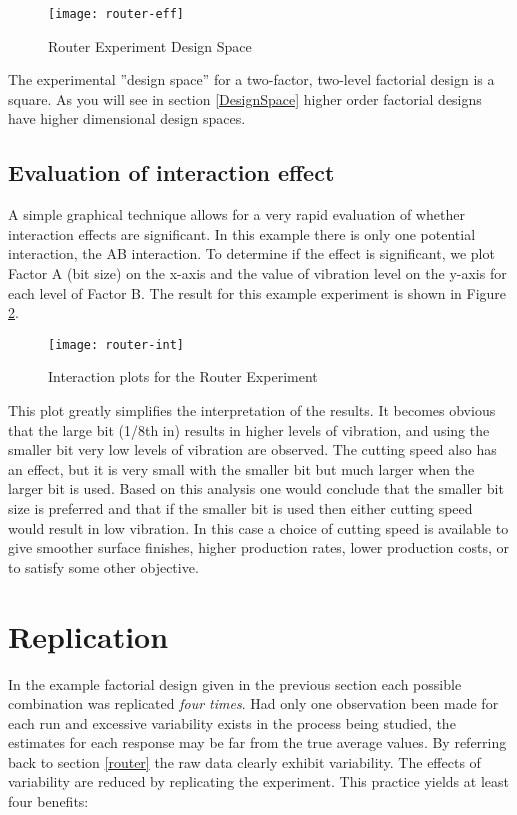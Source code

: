 \begin{figure}[h]\caption{Router Experiment Design Space}\label{fig3}
\begin{center}
\texttt{[image: router-eff]}
\end{center}
\end{figure}

\label{2facspace}
The experimental ''design space'' for a two-factor, two-level factorial design is a square.  As you will see in  section \ref{DesignSpace} higher order factorial designs have higher dimensional design spaces.

\subsection{Evaluation of interaction effect}
A simple graphical technique allows for a very rapid evaluation of whether interaction effects are significant.  In this example there is only one potential interaction, the AB interaction.  To determine if the effect is significant, we plot Factor A (bit size) on the x-axis and the value of vibration level on the y-axis for each level of Factor B.  The result for this example experiment is shown in Figure \ref{fig4}.
\begin{figure}[h]\caption{Interaction plots for the Router Experiment}\label{fig4}
\begin{center}
\texttt{[image: router-int]}
\end{center}
\end{figure}

This plot greatly simplifies the interpretation of the results.  It becomes obvious that the large bit (1/8th in) results in higher levels of vibration, and using the smaller bit very low levels of vibration are observed.  The cutting speed also has an effect, but it is very small with the smaller bit but much larger when the larger bit is used.  Based on this analysis one would conclude that the smaller bit size is preferred and that if the smaller bit is used then either cutting speed would result in low vibration.  In this case a choice of cutting speed is available to give smoother surface finishes, higher production rates, lower production costs, or to satisfy some other objective.


\section{Replication}
In the example factorial design given in the previous section each possible combination was replicated \textit{four times}. Had only one observation been made for each run and excessive variability exists in the process being studied, the estimates for each response may be far from the true average values. By referring back to section \ref{router} the raw data clearly exhibit variability. The effects of variability are reduced by replicating the experiment.  This practice yields at least four benefits:

